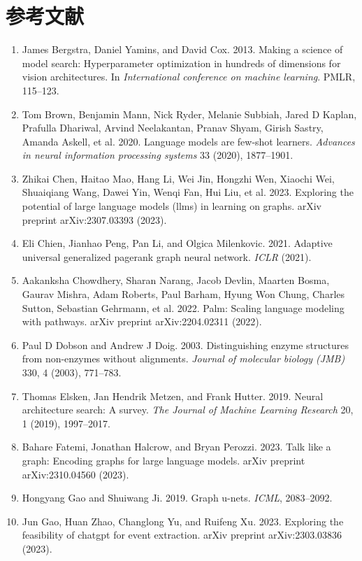 \documentclass[11pt,UTF8,fontset=fandol]{ctexart}
\begin{document}
\section*{参考文献}
\begin{enumerate}[leftmargin=2em,labelsep=0.5em]
\item James Bergstra, Daniel Yamins, and David Cox. 2013. Making a science of model search: Hyperparameter optimization in hundreds of dimensions for vision architectures. In \textit{International conference on machine learning}. PMLR, 115--123.
\item Tom Brown, Benjamin Mann, Nick Ryder, Melanie Subbiah, Jared D Kaplan, Prafulla Dhariwal, Arvind Neelakantan, Pranav Shyam, Girish Sastry, Amanda Askell, et al. 2020. Language models are few-shot learners. \textit{Advances in neural information processing systems} 33 (2020), 1877--1901.
\item Zhikai Chen, Haitao Mao, Hang Li, Wei Jin, Hongzhi Wen, Xiaochi Wei, Shuaiqiang Wang, Dawei Yin, Wenqi Fan, Hui Liu, et al. 2023. Exploring the potential of large language models (llms) in learning on graphs. arXiv preprint arXiv:2307.03393 (2023).
\item Eli Chien, Jianhao Peng, Pan Li, and Olgica Milenkovic. 2021. Adaptive universal generalized pagerank graph neural network. \textit{ICLR} (2021).
\item Aakanksha Chowdhery, Sharan Narang, Jacob Devlin, Maarten Bosma, Gaurav Mishra, Adam Roberts, Paul Barham, Hyung Won Chung, Charles Sutton, Sebastian Gehrmann, et al. 2022. Palm: Scaling language modeling with pathways. arXiv preprint arXiv:2204.02311 (2022).
\item Paul D Dobson and Andrew J Doig. 2003. Distinguishing enzyme structures from non-enzymes without alignments. \textit{Journal of molecular biology (JMB)} 330, 4 (2003), 771--783.
\item Thomas Elsken, Jan Hendrik Metzen, and Frank Hutter. 2019. Neural architecture search: A survey. \textit{The Journal of Machine Learning Research} 20, 1 (2019), 1997--2017.
\item Bahare Fatemi, Jonathan Halcrow, and Bryan Perozzi. 2023. Talk like a graph: Encoding graphs for large language models. arXiv preprint arXiv:2310.04560 (2023).
\item Hongyang Gao and Shuiwang Ji. 2019. Graph u-nets. \textit{ICML}, 2083--2092.
\item Jun Gao, Huan Zhao, Changlong Yu, and Ruifeng Xu. 2023. Exploring the feasibility of chatgpt for event extraction. arXiv preprint arXiv:2303.03836 (2023).

\end{enumerate}
\end{document}
